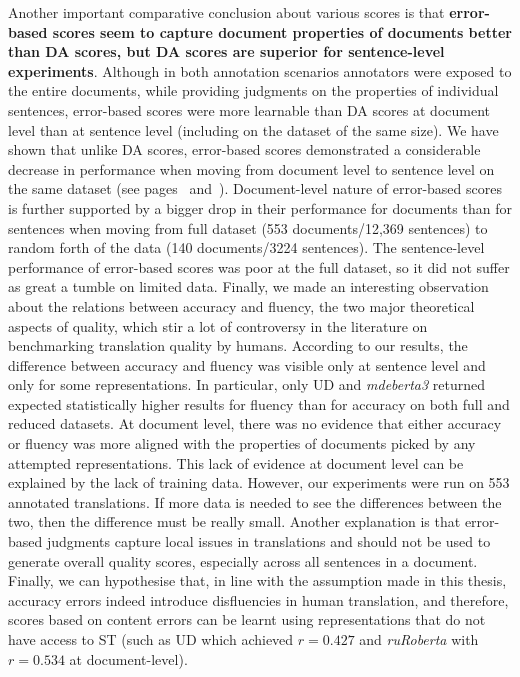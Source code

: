 Another important comparative conclusion about various scores is that \textbf{error-based scores seem to capture document properties of documents better than DA scores, but DA scores are superior for sentence-level experiments}. 
Although in both annotation scenarios annotators were exposed to the entire documents, while providing judgments on the properties of individual sentences, error-based scores were more learnable than DA scores at document level than at sentence level (including on the dataset of the same size). We have shown that unlike DA scores, error-based scores demonstrated a considerable decrease in performance when moving from document level to sentence level on the same dataset (see pages~\pageref{pg:downward_slide} and~\pageref{pg:no_slide_for_da_when_moving_to_sent}). 
Document-level nature of error-based scores is further supported by a bigger drop in their performance for documents than for sentences when moving from full dataset (553 documents/12,369 sentences) to random forth of the data (140 documents/3224 sentences). The sentence-level performance of error-based scores was poor at the full dataset, so it did not suffer as great a tumble on limited data.
Finally, we made an interesting observation about the relations between accuracy and fluency, the two major theoretical aspects of quality, which stir a lot of controversy  in the literature on benchmarking translation quality by humans.
According to our results, the difference between accuracy and fluency was visible only at sentence level and only for some representations. In particular, only UD and \textit{mdeberta3} returned expected statistically higher results for fluency than for accuracy on both full and reduced datasets. %
At document level, there was no evidence that either accuracy or fluency was more aligned with the properties of documents picked by any attempted representations. 
This lack of evidence at document level can be explained by the lack of training data. 
However, our experiments were run on 553 annotated translations. If more data is needed to see the differences between the two, then the difference must be really small. Another explanation is that error-based judgments capture local issues in translations and should not be used to generate overall quality scores, especially across all sentences in a document. Finally, we can hypothesise that, in line with the assumption made in this thesis, accuracy errors indeed introduce disfluencies in human translation, and therefore, scores based on content errors can be learnt using representations that do not have access to ST (such as UD which achieved $r=0.427$ and \textit{ruRoberta} with $r=0.534$ at document-level).
